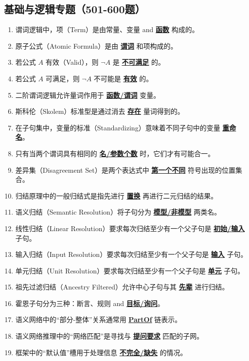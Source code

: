 \documentclass[12pt,a4paper,openany]{ctexbook}
\begin{document}
\subsection{基础与逻辑专题（501-600题）}
\begin{enumerate}[resume,leftmargin=2em,itemsep=1pt]
\item 谓词逻辑中，项（Term）是由常量、变量 and \underline{\textbf{函数}} 构成的。
\item 原子公式（Atomic Formula）是由 \underline{\textbf{谓词}} 和项构成的。
\item 若公式 $A$ 有效（Valid），则 $\neg A$ 是 \underline{\textbf{不可满足}} 的。
\item 若公式 $A$ 可满足，则 $\neg A$ 不可能是 \underline{\textbf{有效}} 的。
\item 二阶谓词逻辑允许量词作用于 \underline{\textbf{函数/谓词}} 变量。
\item 斯科伦（Skolem）标准型是通过消去 \underline{\textbf{存在}} 量词得到的。
\item 在子句集中，变量的标准（Standardizing）意味着不同子句中的变量 \underline{\textbf{重命名}}。
\item 只有当两个谓词具有相同的 \underline{\textbf{名/参数个数}} 时，它们才有可能合一。
\item 差异集（Disagreement Set）是两个表达式中 \underline{\textbf{第一个不同}} 符号出现的位置集合。
\item 归结原理中的一般归结式是指先进行 \underline{\textbf{置换}} 再进行二元归结的结果。
\item 语义归结（Semantic Resolution）将子句分为 \underline{\textbf{模型/非模型}} 两类名。
\item 线性归结（Linear Resolution）要求每次归结至少有一个父子句是 \underline{\textbf{初始/输入}} 子句。
\item 输入归结（Input Resolution）要求每次归结至少有一个父子句是 \underline{\textbf{输入}} 子句。
\item 单元归结（Unit Resolution）要求每次归结至少有一个父子句是 \underline{\textbf{单元}} 子句。
\item 祖先过滤归结（Ancestry Filtered）允许中心子句与其 \underline{\textbf{先辈}} 进行归结。
\item 霍恩子句分为三种：断言、规则 and \underline{\textbf{目标/询问}}。
\item 语义网络中的“部分-整体”关系通常用 \underline{\textbf{PartOf}} 链表示。
\item 语义网络推理中的“网络匹配”是寻找与 \underline{\textbf{提问要求}} 匹配的子网。
\item 框架中的“默认值”槽用于处理信息 \underline{\textbf{不完全/缺失}} 的情况。

\end{enumerate}
\end{document}
